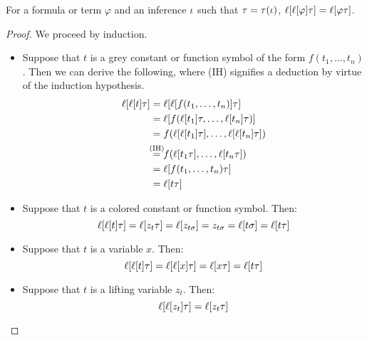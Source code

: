 \documentclass[,%
	draft=false,%
	numbers=noendperiod
	11pt,
	a4paper,
	oneside,%
	openany,
]{memoir}
\begin{document}
\begin{lemma}
	\label{lemma:lifting_tau_commute}
	For a formula or term $\varphi$ and an inference $\iota$ such that $\tau = \tau(\iota)$,
	$\lifboth{\lifboth{ \varphi} \tau} =\nolinebreak \lifboth{ \varphi \tau } $.
\end{lemma}
\begin{proof}
	We proceed by induction.

	\begin{itemize}
		\item Suppose that $t$ is a grey constant or function symbol of the form $f(t_1, \dots, t_n)$.
			Then we can derive the following, where (IH) signifies a deduction by virtue of the induction hypothesis. 
			\begin{align*}
				\lifboth{\lifboth{t}\tau} &= \lifboth{\lifboth{ f(t_1, \dots, t_n)}\tau} \\
																  &= \lifboth{ f(\lifboth{t_1}\tau, \dots, \lifboth{t_n}\tau) } \\
																	&= f(\lifboth{\lifboth{t_1}\tau}, \dots, \lifboth{\lifboth{t_n}\tau}) \\
																 	&\stackrel{\mathclap{\text{(IH)}}}= f(\lifboth{t_1\tau}, \dots, \lifboth{t_n\tau}) \\
																	&= \lifboth{f(t_1, \dots, t_n)\tau} \\
																	&= \lifboth{t\tau}
			\end{align*}
		\item Suppose that $t$ is a colored constant or function symbol. Then:
			\[
				\ell[\ell[t]\tau]= \ell[z_t\tau] 
				= \ell[z_{t\sigma}] 
				= z_{t\sigma} 
				= \ell[t\sigma] 
				= \ell[t\tau]
			\]
		\item Suppose that $t$ is a variable $x$. Then:
			\[
				\ell[\ell[t]\tau] = \ell[\ell[ x]\tau] = \ell[x\tau] = \ell[t\tau]
			\]
		\item Suppose that $t$ is a lifting variable $z_t$. Then:
			\[
				\ell[\ell[z_t]\tau] = \ell[z_t\tau] 
				\qedhere
			\]
	\end{itemize}

\end{proof}
\end{document}
